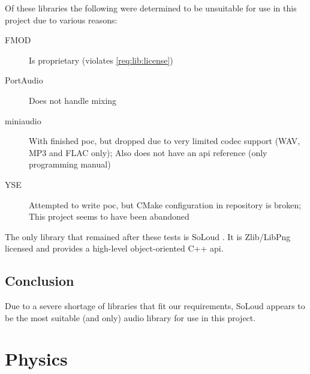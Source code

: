 \documentclass{projdoc}
\begin{document}
Of these libraries the following were determined to be unsuitable for use in this
project due to various reasons:\noparbreak
\begin{description}
	\item[FMOD \autocite{lib:fmod}] Is proprietary (violates \cref{req:lib:license})
	\item[PortAudio \autocite{lib:portaudio}] Does not handle mixing
	\item[miniaudio \autocite{lib:miniaudio}] With finished \gls{poc}, but dropped due
		to very limited codec support (WAV, MP3 and FLAC only); Also does not have an
		\gls{api} reference (only programming manual)
	\item[YSE \autocite{lib:yse}] Attempted to write \gls{poc}, but CMake configuration
		in repository is broken; This project seems to have been abandoned
\end{description}

The only library that remained after these tests is SoLoud \autocite{lib:soloud}. It
is Zlib/LibPng licensed and provides a high-level object-oriented C++ \gls{api}.

\subsection{Conclusion}
\label{sec:audio:conclusion}

Due to a severe shortage of libraries that fit our requirements, SoLoud appears to be
the most suitable (and only) audio library for use in this project.

% 
% 
% 

\section{Physics}
\end{document}
